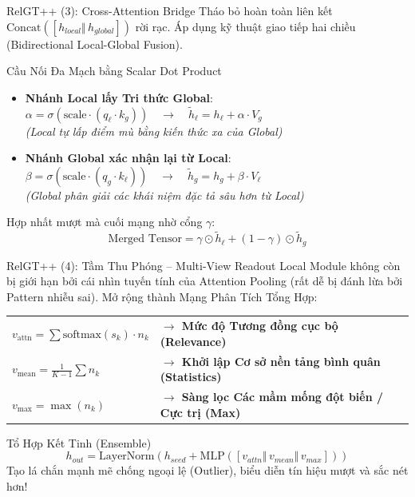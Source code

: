 \documentclass[aspectratio=169,11pt]{beamer}
\begin{document}
\begin{frame}{RelGT++ (3): Cross-Attention Bridge}
Tháo bỏ hoàn toàn liên kết $\text{Concat}([h_{local} \Vert \, h_{global}])$ rời rạc. Áp dụng kỹ thuật giao tiếp hai chiều (Bidirectional Local-Global Fusion).

\begin{block}{Cầu Nối Đa Mạch bằng Scalar Dot Product}
\begin{itemize}
    \item \textbf{Nhánh Local lấy Tri thức Global}:
    $\alpha = \sigma(\text{scale} \cdot (q_{\ell} \cdot k_g)) \quad \to \quad \tilde{h}_\ell = h_\ell + \alpha \cdot V_g$ \\
    \textit{(Local tự lấp điểm mù bằng kiến thức xa của Global)}
    \item \textbf{Nhánh Global xác nhận lại từ Local}:
    $\beta = \sigma(\text{scale} \cdot (q_g \cdot k_\ell)) \quad \to \quad \tilde{h}_g = h_g + \beta \cdot V_\ell$ \\
    \textit{(Global phân giải các khái niệm đặc tả sâu hơn từ Local)}
\end{itemize}
\end{block}

Hợp nhất mượt mà cuối mạng nhờ cổng $\gamma$:
$$ \text{Merged Tensor} = \gamma \odot \tilde{h}_\ell + (1 - \gamma) \odot \tilde{h}_g $$
\end{frame}

\begin{frame}{RelGT++ (4): Tầm Thu Phóng -- Multi-View Readout}
Local Module không còn bị giới hạn bởi cái nhìn tuyến tính của Attention Pooling (rất dễ bị đánh lừa bởi Pattern nhiễu sai). Mở rộng thành Mạng Phân Tích Tổng Hợp:
\vspace{10pt}

\begin{tabular}{ll}
  $v_{\text{attn}} = \sum \text{softmax}(s_k) \cdot n_k$ & \textbf{$\to$ Mức độ Tương đồng cục bộ (Relevance)}\\
  $v_{\text{mean}} = \frac{1}{K-1} \sum n_k$ & \textbf{$\to$ Khởi lập Cơ sở nền tảng bình quân (Statistics)}\\
  $v_{\text{max}}  = \max(n_k)$ & \textbf{$\to$ Sàng lọc Các mầm mống đột biến / Cực trị (Max)}\\
\end{tabular}

\vspace{10pt}
\begin{block}{Tổ Hợp Kết Tinh (Ensemble)}
$$ h_{out} = \text{LayerNorm}(h_{seed} + \text{MLP}([v_{attn} \Vert \,v_{mean} \Vert \,v_{max}])) $$
Tạo lá chắn mạnh mẽ chống ngoại lệ (Outlier), biểu diễn tín hiệu mượt và sắc nét hơn!
\end{block}
\end{frame}
\end{document}
